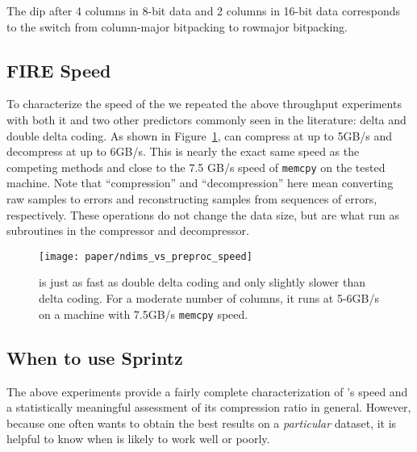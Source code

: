 The dip after 4 columns in 8-bit data and 2 columns in 16-bit data corresponds to the switch from column-major bitpacking to rowmajor bitpacking.

\subsection{FIRE Speed}

To characterize the speed of the \fire we repeated the above throughput experiments with both it and two other predictors commonly seen in the literature: delta and double delta coding. As shown in Figure~\ref{fig:ndims_vs_preproc_speed}, \fire can compress at up to 5GB/s and decompress at up to 6GB/s. This is nearly the exact same speed as the competing methods and close to the 7.5 GB/s speed of \texttt{memcpy} on the tested machine. Note that ``compression'' and ``decompression'' here mean converting raw samples to errors and reconstructing samples from sequences of errors, respectively. These operations do not change the data size, but are what run as subroutines in the \minesp compressor and decompressor.

\begin{figure}[h]
\begin{center}
    \texttt{[image: paper/ndims\_vs\_preproc\_speed]}
    \caption{\fire is just as fast as double delta coding and only slightly slower than delta coding. For a moderate number of columns, it runs at 5-6GB/s on a machine with 7.5GB/s \texttt{memcpy} speed.}
    \label{fig:ndims_vs_preproc_speed}
\end{center}
\end{figure}

\subsection{When to use Sprintz}


The above experiments provide a fairly complete characterization of \mine's speed and a statistically meaningful assessment of its compression ratio in general. However, because one often wants to obtain the best results on a \textit{particular} dataset, it is helpful to know when \minesp is likely to work well or poorly.

